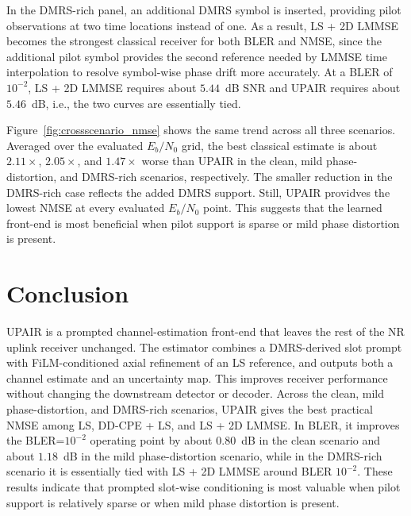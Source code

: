 \documentclass[conference,letterpaper]{IEEEtran}
\newcommand{\snr}{E_b/N_0}
\begin{document}
	In the DMRS-rich panel, an additional DMRS symbol is inserted, providing pilot observations at two time locations instead of one. As a result, LS + 2D LMMSE becomes the strongest classical receiver for both BLER and NMSE{}, since the additional pilot symbol provides the second reference needed by LMMSE time interpolation to resolve symbol-wise phase drift more accurately. At a BLER of $10^{-2}$, LS + 2D LMMSE requires about $5.44$~dB SNR and UPAIR{} requires about $5.46$~dB, i.e., the two curves are essentially tied.
	
	Figure~\ref{fig:crossscenario_nmse} shows the same trend across all three scenarios. Averaged over the evaluated $\snr$ grid, the best classical estimate is about $2.11\times$, $2.05\times$, and $1.47\times$ worse than UPAIR{} in the clean, mild phase-distortion, and DMRS-rich scenarios, respectively. The smaller reduction in the DMRS-rich case reflects the added DMRS support. Still, UPAIR{} providves the lowest NMSE{} at every evaluated $\snr$ point. This suggests that the learned front-end is most beneficial when pilot support is sparse or mild phase distortion is present.
	
	
	
	\vspace{-.2cm}
	\section{Conclusion}
	\label{sec:conclusion}
	
	UPAIR{} is a prompted channel-estimation front-end that leaves the rest of the NR uplink receiver unchanged. The estimator combines a DMRS-derived slot prompt with FiLM-conditioned axial refinement of an LS reference, and outputs both a channel estimate and an uncertainty map. This improves receiver performance without changing the downstream detector or decoder.	Across the clean, mild phase-distortion, and DMRS-rich scenarios, UPAIR{} gives the best practical NMSE{} among LS, DD-CPE + LS, and LS + 2D LMMSE. 	In BLER, it improves the BLER=$10^{-2}$ operating point by about $0.80$~dB in the clean scenario and about $1.18$~dB in the mild phase-distortion scenario, while in the DMRS-rich scenario it is essentially tied with LS + 2D LMMSE around BLER $10^{-2}$. These results indicate that prompted slot-wise conditioning is most valuable when pilot support is relatively sparse or when mild phase distortion is present.
	
	\vspace{-.3cm}
	
	
	
	
\end{document}
